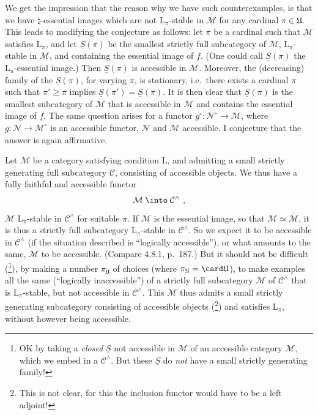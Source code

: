 We get the impression that the reason why we have such counterexamples, is that we have $\natural$-essential images which are not $\mathrm{L}_\pi$-stable in $\mathcal{M}$ for any cardinal $\pi \in \mathfrak{U}$. This leads to modifying the conjecture as follows: let $\pi$ be a cardinal such that $\mathcal{M}$ satisfies $\mathrm{L}_\pi$,
and let $\underline{S}(\pi)$ be the smallest strictly full subcategory of $\mathcal{M}$, $\mathrm{L}_\pi$-stable in $\mathcal{M}$, and containing the essential image of $f$. (One could call $\underline{S}(\pi)$ the $\mathrm{L}_\pi$-essential image.) Then $\underline{S}(\pi)$ is accessible in $\mathcal{M}$. Moreover, the (decreasing) family of the $\underline{S}(\pi)$, for varying $\pi$, is stationary, i.e.\ there exists a cardinal $\pi$ such that $\pi' \geqslant \pi$ implies $\underline{S}(\pi') = \underline{S}(\pi)$. It is then clear that $\underline{S}(\pi)$ is the smallest subcategory of $\mathcal{M}$ that is accessible in $\mathcal{M}$ and contains the essential image of $f$. The same question arises for a functor $g^\circ : \mathcal{N}^\circ \longrightarrow \mathcal{M}$, where $g : \mathcal{N} \longrightarrow \mathcal{M}^\circ$ is an accessible functor, $\mathcal{N}$ and $\mathcal{M}$ accessible. I conjecture that the answer is again affirmative.


Let $\mathcal{M}$ be a category satisfying condition L, and admitting a small strictly generating full subcategory $\mathcal{C}$, consisting of accessible objects. We thus have a fully faithful and accessible functor
\[
\mathcal{M} \;\into\; \mathcal{C}^\wedge\ ,
\]
$\mathcal{M}$ $\mathrm{L}_\pi$-stable in $\mathcal{C}^\wedge$ for suitable $\pi$. If $\overline{\mathcal{M}}$ is the essential image, so that $\mathcal{M} \simeq \overline{\mathcal{M}}$, it is thus a strictly full subcategory $\mathrm{L}_\pi$-stable in $\mathcal{C}^\wedge$. So we expect it to be accessible in $\mathcal{C}^\wedge$ (if the situation described is ``logically accessible''), or what amounts to the same, $\mathcal{M}$ to be accessible. (Compare 4.8.1, p.~187.) But it should not be difficult (\footnote[192]{OK by taking a \textit{closed} $\underline{S}$ not accessible in $\mathcal{M}$ of an accessible category $\mathcal{M}$, which we embed in a $\mathcal{C}^\wedge$. But these $\underline{S}$ do \textit{not} have a small strictly generating family! %
}), by making a number $\pi_{\mathfrak{U}}$ of choices (where $\pi_{\mathfrak{U}} = \card\mathfrak{U}$), to make examples all the same (``logically inaccessible'') of a strictly full subcategory $\mathcal{M}$ of $\mathcal{C}^\wedge$ that is $\mathrm{L}_\pi$-stable, but not accessible in $\mathcal{C}^\wedge$. This $\mathcal{M}$ thus admits a small strictly generating subcategory consisting of accessible objects (\footnote[193]{This is not clear, for this the inclusion functor would have to be a left adjoint!}) and satisfies $\mathrm{L}_\pi$, without however being accessible.

